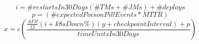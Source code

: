 \documentclass[preview]{standalone}
\begin{document}
\begin{equation}
	i = \# restartsIn30Days \left(\# TMs + \# JMs\right) + \#deploys
\end{equation}
\begin{equation}
	p = \left(\# expectedPoisonPillEvents * MTTR\right)
\end{equation}
\begin{equation}
	x = c \left(\frac{\frac{AFR}{12} \left(i + k8sDown\%\right) \left(y + checkpointInterval\right) + p}{timeUnitsIn30Days}\right)
\end{equation}
\end{document}
